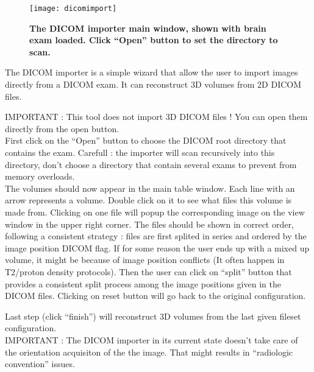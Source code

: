 \begin{figure}[htbp]
  \centering \texttt{[image: dicomimport]}
  \caption{{\bf The DICOM importer main window, shown with brain exam loaded. Click
      ``Open'' button to set the directory to scan.}
  \label{fig:dicomimport}}
\end{figure}

The DICOM importer is a simple wizard that allow the user to import images directly from
a DICOM exam. It can reconstruct 3D volumes from 2D DICOM files. 

IMPORTANT : This tool does not import 3D DICOM files ! You can open them directly from the
open button. 
\ \\

First click on the ``Open'' button to choose the DICOM root directory that contains the
exam. Carefull : the importer will scan recursively into this directory, don't choose a
directory that contain several exams to prevent from memory overloads.
\ \\

The volumes should now appear in the main table window. Each line with an arrow represents a
volume. Double click on it to see what files this volume is made from. Clicking on one
file will popup the corresponding image on the view window in the upper right corner. The
files should be shown in correct order, following a consistent strategy : files are first
splited in series and ordered by the image position DICOM flag. If for some reason the
user ends up with a mixed up volume, it might be because of image position conflicts (It
often happen in T2/proton density protocols). Then the user can click on ``split'' button
that provides a consistent split process among the image positions given in the DICOM
files. Clicking on reset button will go back to the original configuration.

Last step (click ``finish'') will reconstruct 3D volumes from the last given fileset
configuration.
\ \\

IMPORTANT : The DICOM importer in its current state doesn't take care of the orientation
acquisiton of the the image. That might results in ``radiologic convention'' issues.
\ \\


